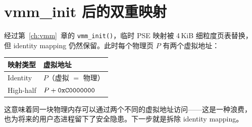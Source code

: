 \section{vmm\_init 后的双重映射}

经过第~\ref{ch:vmm}~章的 \texttt{vmm\_init()}，临时 PSE 映射被 4\,KiB 细粒度页表替换，
但 identity mapping 仍然保留。此时每个物理页 $P$ 有两个虚拟地址：

\begin{center}
\begin{tabular}{ll}
  \toprule
  \textbf{映射类型} & \textbf{虚拟地址} \\
  \midrule
  Identity    & $P$（虚拟 $=$ 物理）\\
  High-half   & $P + \texttt{0xC0000000}$ \\
  \bottomrule
\end{tabular}
\end{center}

这意味着同一块物理内存可以通过两个不同的虚拟地址访问——这是一种浪费，
也为将来的用户态进程留下了安全隐患。下一步就是拆除 identity mapping。


